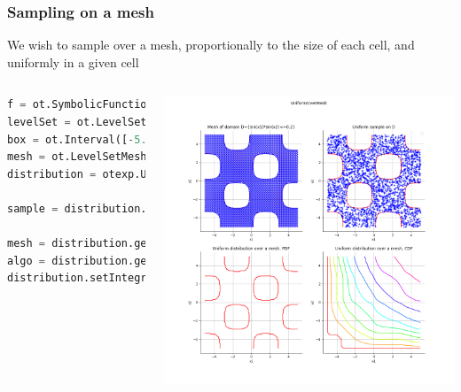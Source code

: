 \documentclass[aspectratio=169]{beamer}
\begin{document}
\begin{frame}[containsverbatim]
\frametitle{Sampling on a mesh}

We wish to sample over a mesh, proportionally to the size of each cell, and uniformly in a given cell

  \begin{columns}

\begin{lstlisting}[language=Python, numbers = none]
f = ot.SymbolicFunction(['x', 'y'], ['sin(x)*sin(y)'])
levelSet = ot.LevelSet(f, ot.Less(), 0.2)
box = ot.Interval([-5.0]*2, [5.0]*2)
mesh = ot.LevelSetMesher([50]*2).build(levelSet, box, False)
distribution = otexp.UniformOverMesh(mesh)

sample = distribution.getSample(5)

mesh = distribution.getMesh()
algo = distribution.getIntegrationAlgorithm()
distribution.setIntegrationAlgorithm(ot.GaussLegendre([10] * 2))
\end{lstlisting}


\centering
    \includegraphics[width=.9\textwidth]{figures/UniformOverMesh.png}
  \end{columns}



\end{frame}


\end{document}
